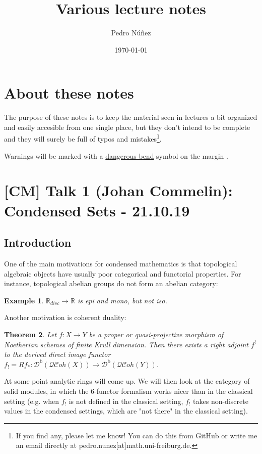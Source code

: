 \documentclass[12pt]{article}
\title{Various lecture notes}
\author{Pedro Núñez}
\date{\today}
\theoremstyle{darkgreentheorem}
\newtheorem{thm}{Theorem}
\theoremstyle{darkbluedefinition}
\theoremstyle{darkredexample}
\newtheorem{exa}[thm]{Example}
\theoremstyle{remark}
\newcommand{\R}{\mathbb{R}}
\newcommand{\1}{\mathbbm{1}}
\newcommand{\Db}{\mathscr{D}^{\mathrm{b}}}
\newcommand{\QCoh}{\mathscr{QC}oh}
\newcommand{\db}{\marginnote{\dbend}}
\begin{document}
\maketitle

\tableofcontents

\section{About these notes}

The purpose of these notes is to keep the material seen in lectures a bit organized and easily accesible from one single place, but they don't intend to be complete and they will surely be full of typos and mistakes\footnote{If you find any, please let me know! You can do this from GitHub or write me an email directly at pedro.nunez[at]math.uni-freiburg.de.}.

Warnings will be marked with a \href{https://en.wikipedia.org/wiki/Bourbaki_dangerous_bend_symbol}{dangerous bend} symbol on the margin \db.

\section{[CM] Talk 1 (Johan Commelin): Condensed Sets - 21.10.19}

\subsection{Introduction}

One of the main motivations for condensed mathematics is that topological algebraic objects have usually poor categorical and functorial properties.
For instance, topological abelian groups do not form an abelian category:

\begin{exa}
    $\R_{disc}\to \R$ is epi and mono, but not iso.
\end{exa}

Another motivation is coherent duality:

\begin{thm}
    Let $f\colon X\to Y$ be a proper or quasi-projective morphism of Noetherian schemes of finite Krull dimension. Then there exists a right adjoint $f^{!}$ to the derived direct image functor $f_{!}=Rf_{*}\colon \Db(\QCoh(X))\to \Db(\QCoh(Y))$.
\end{thm}

At some point analytic rings will come up.
We will then look at the category of solid modules, in which the 6-functor formalism works nicer than in the classical setting (e.g. when $f_{!}$ is not defined in the classical setting, $f_{!}$ takes non-discrete values in the condensed settings, which are "not there" in the classical setting).
\end{document}

